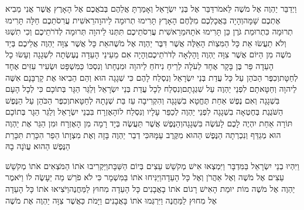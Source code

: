 \documentclass[../main/main.tex]{subfiles}
\begin{document}
\begin{multicols*}{\ncols}
וַיְדַבֵּר יַהְוֶה אֶל מֹשֶׁה לֵּאמֹר\PreVerseSpace{}דַּבֵּר אֶל בְּנֵי יִשְׂרָאֵל וְאָמַרְתָּ אֲלֵהֶם בְּבֹאֲכֶם אֶל הָאָרֶץ אֲשֶׁר אֲנִי מֵבִיא אֶתְכֶם שָׁמָּה\PreVerseSpace{}וְהָיָה בַּאֲכָלְכֶם מִלֶּחֶם הָאָרֶץ תָּרִימוּ תְרוּמָה לַיהוָה\PreVerseSpace{}רֵאשִׁית עֲרִסֹתֵכֶם חַלָּה תָּרִימוּ תְרוּמָה כִּתְרוּמַת גֹּרֶן כֵּן תָּרִימוּ אֹתָהּ\PreVerseSpace{}מֵרֵאשִׁית עֲרִסֹתֵיכֶם תִּתְּנוּ לַיהוָה תְּרוּמָה לְדֹרֹתֵיכֶם \ClosedSection{}וְכִי תִשְׁגּוּ וְלֹא תַעֲשׂוּ אֵת כָּל הַמִּצְוֺת הָאֵלֶּה אֲשֶׁר דִּבֶּר יַהְוֶה אֶל מֹשֶׁה\PreVerseSpace{}אֵת כָּל אֲשֶׁר צִוָּה יַהְוֶה אֲלֵיכֶם בְּיַד מֹשֶׁה מִן הַיּוֹם אֲשֶׁר צִוָּה יַהְוֶה וָהָלְאָה לְדֹרֹתֵיכֶם\PreVerseSpace{}וְהָיָה אִם מֵעֵינֵי הָעֵדָה נֶעֶשְׂתָה לִשְׁגָגָה וְעָשׂוּ כָל הָעֵדָה פַּר בֶּן בָּקָר אֶחָד לְעֹלָה לְרֵיחַ נִיחֹחַ לַיהוָה וּמִנְחָתוֹ וְנִסְכּוֹ כַּמִּשְׁפָּט וּשְׂעִיר עִזִּים אֶחָד לְחַטָּת\PreVerseSpace{}וְכִפֶּר הַכֹּהֵן עַל כָּל עֲדַת בְּנֵי יִשְׂרָאֵל וְנִסְלַח לָהֶם כִּי שְׁגָגָה הוּא וְהֵם הֵבִיאוּ אֶת קָרְבָּנָם אִשֶּׁה לַיהוָה וְחַטָּאתָם לִפְנֵי יַהְוֶה עַל שִׁגְגָתָם\PreVerseSpace{}וְנִסְלַח לְכָל עֲדַת בְּנֵי יִשְׂרָאֵל וְלַגֵּר הַגָּר בְּתוֹכָם כִּי לְכָל הָעָם בִּשְׁגָגָה \ClosedSection{}וְאִם נֶפֶשׁ אַחַת תֶּחֱטָא בִשְׁגָגָה וְהִקְרִיבָה עֵז בַּת שְׁנָתָהּ לְחַטָּאת\PreVerseSpace{}וְכִפֶּר הַכֹּהֵן עַל הַנֶּפֶשׁ הַשֹּׁגֶגֶת בְּחֶטְאָה בִשְׁגָגָה לִפְנֵי יַהְוֶה לְכַפֵּר עָלָיו וְנִסְלַח לוֹ\PreVerseSpace{}הָאֶזְרָח בִּבְנֵי יִשְׂרָאֵל וְלַגֵּר הַגָּר בְּתוֹכָם תּוֹרָה אַחַת יִהְיֶה לָכֶם לָעֹשֶׂה בִּשְׁגָגָה\PreVerseSpace{}וְהַנֶּפֶשׁ אֲשֶׁר תַּעֲשֶׂה בְּיָד רָמָה מִן הָאֶזְרָח וּמִן הַגֵּר אֶת יַהְוֶה הוּא מְגַדֵּף וְנִכְרְתָה הַנֶּפֶשׁ הַהוּא מִקֶּרֶב עַמָּהּ\PreVerseSpace{}כִּי דְבַר יַהְוֶה בָּזָה וְאֶת מִצְוָתוֹ הֵפַר הִכָּרֵת תִּכָּרֵת הַנֶּפֶשׁ הַהוּא עֲוֺנָה בָהּ\OpenSection{}\par
{}וַיִּהְיוּ בְנֵי יִשְׂרָאֵל בַּמִּדְבָּר וַיִּמְצְאוּ אִישׁ מְקֹשֵׁשׁ עֵצִים בְּיוֹם הַשַּׁבָּת\PreVerseSpace{}וַיַּקְרִיבוּ אֹתוֹ הַמֹּצְאִים אֹתוֹ מְקֹשֵׁשׁ עֵצִים אֶל מֹשֶׁה וְאֶל אַהֲרֹן וְאֶל כָּל הָעֵדָה\PreVerseSpace{}וַיַּנִּיחוּ אֹתוֹ בַּמִּשְׁמָר כִּי לֹא פֹרַשׁ מַה יֵּעָשֶׂה לוֹ \ClosedSection{}וַיֹּאמֶר יַהְוֶה אֶל מֹשֶׁה מוֹת יוּמַת הָאִישׁ רָגוֹם אֹתוֹ בָאֲבָנִים כָּל הָעֵדָה מִחוּץ לַמַּחֲנֶה\PreVerseSpace{}וַיֹּצִיאוּ אֹתוֹ כָּל הָעֵדָה אֶל מִחוּץ לַמַּחֲנֶה וַיִּרְגְּמוּ אֹתוֹ בָּאֲבָנִים וַיָּמֹת כַּאֲשֶׁר צִוָּה יַהְוֶה אֶת מֹשֶׁה\OpenSection{}\par

\end{multicols*}
\end{document}
